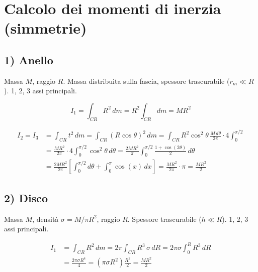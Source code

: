 
\section{Calcolo dei momenti di inerzia (simmetrie)}

\subsection{1) Anello}

Massa $M$, raggio $R$. Massa distribuita sulla fascia, spessore trascurabile ($r_m \ll R$). 1, 2, 3 assi principali.


\begin{equation}
\boxed{I_1} = \int_{CR} R^2\,dm = R^2 \int_{CR} dm = \boxed{MR^2}
\end{equation}

\begin{align*}
\boxed{I_2 = I_3} &= \int_{CR} t^2\,dm = \int_{CR} (R\cos\theta)^2\,dm = \int_{CR} R^2\cos^2\theta\,\frac{M\,d\theta}{2\pi} \cdot 4\int_0^{\pi/2} \\
&= \frac{MR^2}{2\pi} \cdot 4 \int_0^{\pi/2} \cos^2\theta\,d\theta = \frac{2MR^2}{\pi}\int_0^{\pi/2}\frac{1+\cos(2\theta)}{2}\,d\theta \\
&= \frac{2MR^2}{2\pi}\left[\int_0^{\pi/2} d\theta + \int_0^{\pi} \cos(x)\,dx\right] = \frac{MR^2}{2\pi}\cdot\pi = \boxed{\frac{MR^2}{2}}
\end{align*}


\subsection{2) Disco}

Massa $M$, densità $\sigma = M/\pi R^2$, raggio $R$. Spessore trascurabile ($h \ll R$). 1, 2, 3 assi principali.


\begin{align*}
\boxed{I_1} &= \int_{CR} R^2\,dm = 2\pi \int_{CR} R^3\,\sigma\,dR = 2\pi\sigma \int_0^R R^3\,dR \\
&= \frac{2\pi\sigma R^4}{4} = (\pi\sigma R^2)\frac{R^2}{2} = \boxed{\frac{MR^2}{2}}
\end{align*}

